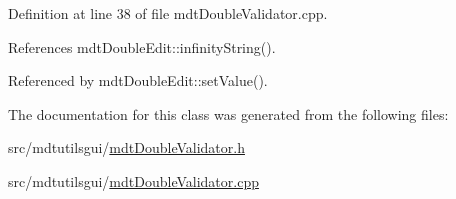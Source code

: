 Definition at line 38 of file mdt\-Double\-Validator.\-cpp.



References mdt\-Double\-Edit\-::infinity\-String().



Referenced by mdt\-Double\-Edit\-::set\-Value().



The documentation for this class was generated from the following files\-:\begin{DoxyCompactItemize}
\item 
src/mdtutilsgui/\hyperlink{mdt_double_validator_8h}{mdt\-Double\-Validator.\-h}\item 
src/mdtutilsgui/\hyperlink{mdt_double_validator_8cpp}{mdt\-Double\-Validator.\-cpp}\end{DoxyCompactItemize}
